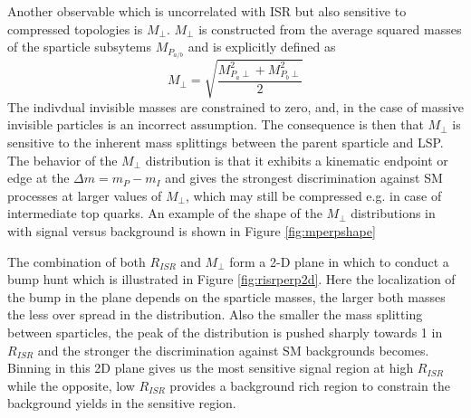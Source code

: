 Another observable which is uncorrelated with ISR but also sensitive to compressed topologies is $M_\perp$. $M_\perp$ is constructed from the average squared masses of the sparticle subsytems $M_{P_{a/b}}$ and is explicitly defined as
\begin{equation}
M_\perp = \sqrt{\frac{M_{P_a\perp}^2 + M_{P_b\perp}^2}{2}}
\end{equation}
The indivdual invisible masses are constrained to zero, and, in the case of massive invisible particles is an incorrect assumption. The consequence is then that $M_\perp$ is sensitive to the inherent mass splittings between the parent sparticle and LSP. The behavior of the $M_\perp$ distribution is that it exhibits a kinematic endpoint or edge at the $\Delta m = m_P - m_I$ and gives the strongest discrimination against SM processes at larger values of $M_\perp$, which may still be compressed e.g. in case of intermediate top quarks. An example of the shape of the $M_\perp$ distributions in with signal versus background is shown in Figure \ref{fig:mperpshape}


The combination of both $R_{ISR}$ and $M_\perp$ form a 2-D plane in which to conduct a bump hunt which is illustrated in Figure \ref{fig:risrperp2d}. Here the localization of the bump in the plane depends on the sparticle masses, the larger both masses the less over spread in the distribution. Also the smaller the mass splitting between sparticles, the peak of the distribution is pushed sharply towards 1 in $R_{ISR}$ and the stronger the discrimination against SM backgrounds becomes. Binning in this 2D plane gives us the most sensitive signal region at high $R_{ISR}$  while the opposite, low $R_{ISR}$ provides a background rich region to constrain the background yields in the sensitive region. 




